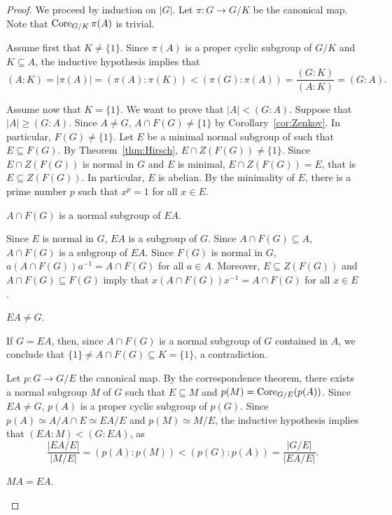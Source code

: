 \begin{proof}
	We proceed by induction on $|G|$. Let $\pi\colon G\to G/K$ be the canonical map. Note that $\operatorname{Core}_{G/K}\pi(A)$ is trivial. 

	Assume first that $K\ne\{1\}$. Since $\pi(A)$ is a proper cyclic subgroup of 
	$G/K$ and $K\subseteq A$, the inductive hypothesis implies that 
	\[
		(A:K)=|\pi(A)|=(\pi(A):\pi(K))<(\pi(G):\pi(A))=\frac{(G:K)}{(A:K)}=(G:A).
	\]

	Assume now that $K=\{1\}$. We want to prove that $|A|<(G:A)$. Suppose that 
	$|A|\geq (G:A)$. Since $A\ne G$, $A\cap F(G)\ne\{1\}$ by Corollary~\ref{cor:Zenkov}. In particular, $F(G)\ne\{1\}$. Let $E$ be a minimal normal subgroup of 
	such that $E\subseteq F(G)$. By Theorem~\ref{thm:Hirsch}, $E\cap Z(F(G))\ne\{1\}$.  Since 
	$E\cap Z(F(G))$ is normal in $G$ and $E$ is minimal, $E\cap Z(F(G))=E$, that is 
	$E\subseteq Z(F(G))$. In particular, $E$ is abelian. By the minimality of 
	$E$, there is a prime number $p$ such that $x^p=1$ for all $x\in E$. 

	\begin{claim}
		$A\cap F(G)$ is a normal subgroup of $EA$.
	\end{claim}

	Since $E$ is normal in $G$, $EA$ is a subgroup of $G$. Since $A\cap
	F(G)\subseteq A$, $A\cap F(G)$ is a subgroup of $EA$.  Since $F(G)$ is 
	normal in $G$, $a(A\cap F(G))a^{-1}=A\cap F(G)$ for all $a\in A$. Moreover, 
    $E\subseteq Z(F(G))$ and $A\cap F(G)\subseteq F(G)$ imply that 
	$x(A\cap F(G))x^{-1}=A\cap F(G)$ for all $x\in E$. 

	\begin{claim}
		$EA\ne G$.
	\end{claim}

	If $G=EA$, then, since $A\cap F(G)$ is a normal subgroup of $G$
	contained in $A$, we conclude that $\{1\}\ne A\cap F(G)\subseteq K=\{1\}$, a 
	contradiction. 

	\medskip
	Let $p\colon G\to G/E$ the canonical map. By the correspondence theorem,
	there exists a normal subgroup $M$ of $G$ such that $E\subseteq M$ and 
	$p(M)=\operatorname{Core}_{G/E}(p(A))$. Since $EA\ne G$, $p(A)$ is a proper cyclic subgroup 
	of $p(G)$. Since $p(A)\simeq A/A\cap E\simeq EA/E$ and $p(M)\simeq
	M/E$, the inductive hypothesis implies that 
	$(EA:M)<(G:EA)$, as 
	\[
	\frac{|EA/E|}{|M/E|}
	=(p(A):p(M))
	<(p(G):p(A))
	=\frac{|G/E|}{|EA/E|}.
	\]

	\begin{claim}
		$MA=EA$. 
	\end{claim}


\end{proof}
